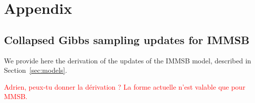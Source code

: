\section{Appendix}
\label{sec:append}

\subsection{Collapsed Gibbs sampling updates for IMMSB}

We provide here the derivation of the updates of the IMMSB model, described in Section~\ref{sec:models}.


\textcolor{red}{Adrien, peux-tu donner la d\'erivation ? La forme actuelle n'est valable que pour MMSB.} 

